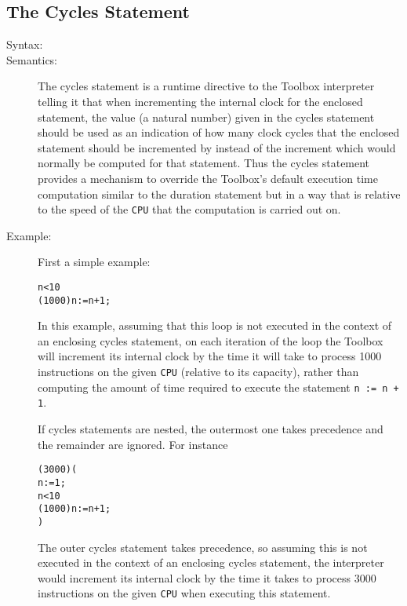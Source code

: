 \documentclass[\pformat,12pt]{article}
\begin{document}
\subsection{The Cycles Statement}

\begin{description}
\item[Syntax:]

\item[Semantics:]
The cycles statement is a runtime directive to the Toolbox interpreter
telling it that when incrementing the internal clock for the enclosed
statement, the value (a natural number)
given in the cycles statement should be used as
an indication of how many clock cycles that the enclosed statement
should be incremented by instead of the increment which would normally
be computed for that statement. Thus the cycles statement provides a
mechanism to override the Toolbox's default execution time
computation similar to the duration statement but in a way that is
relative to the speed of the \texttt{CPU} that the computation is carried
out on.

\item[Example:] First a simple example:
\begin{alltt}
       n < 10 
         (1000) n := n + 1; 
\end{alltt}
In this example, assuming that this loop is not executed in the
context of an enclosing cycles statement, on each iteration of the
loop the Toolbox will increment its internal clock by the time it will
take to process 1000 instructions on the given \texttt{CPU} (relative
to its capacity), rather than computing the amount of time required to
execute the statement \texttt{n := n + 1}. 

If cycles statements are nested, the outermost one takes precedence
and the remainder are ignored. For instance
\begin{alltt}
      (3000)(
        n := 1;
         n < 10 
           (1000) n := n + 1; 
        )
\end{alltt}
The outer cycles statement takes precedence, so assuming this is not
executed in the context of an enclosing cycles statement, the
interpreter would increment its internal clock by the time it takes to
process 3000 instructions on the given \texttt{CPU} when
executing this statement.


\end{description}
\end{document}
